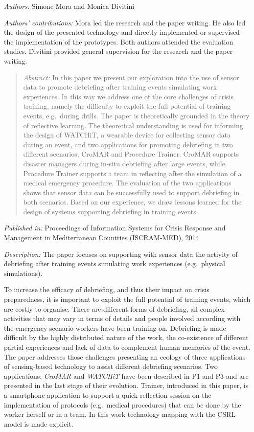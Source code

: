 \emph{Authors:} Simone Mora and Monica Divitini

\emph{Authors' contributions:} Mora led the research and the paper writing. He also led the design of the presented technology and directly implemented or supervised the implementation of the prototypes. Both authors attended the evaluation studies. Divitini provided general supervision for the research and the paper writing.

\begin{quote}
	\emph{Abstract:} In this paper we present our exploration into the use of sensor data to promote debriefing after training events simulating work experiences. In this way we address one of the core challenges of crisis training, namely the difficulty to exploit the full potential of training events, e.g.~during drills. The paper is theoretically grounded in the theory of reflective learning. The theoretical understanding is used for informing the design of WATCHiT, a wearable device for collecting sensor data during an event, and two applications for promoting debriefing in two different scenarios, CroMAR and Procedure Trainer. CroMAR supports disaster managers during in-situ debriefing after large events, while Procedure Trainer supports a team in reflecting after the simulation of a medical emergency procedure. The evaluation of the two applications shows that sensor data can be successfully used to support debriefing in both scenarios. Based on our experience, we draw lessons learned for the design of systems supporting debriefing in training events. 
\end{quote}

\emph{Published in:} Proceedings of Information Systems for Crisis Response and Management in Mediterranean Countries (ISCRAM-MED), 2014

\emph{Description:} The paper focuses on supporting with sensor data the activity of debriefing after training events simulating work experiences (e.g.~physical simulations). 

To increase the efficacy of debriefing, and thus their impact on crisis preparedness, it is important to exploit the full potential of training events, which are costly to organise. There are different forms of debriefing, all complex activities that may vary in terms of details and people involved according with the emergency scenario workers have been training on. Debriefing is made difficult by the highly distributed nature of the work, the co-existence of different partial experiences and lack of data to complement human memories of the event. The paper addresses those challenges presenting an ecology of three applications of sensing-based technology to assist different debriefing scenarios. Two applications: \emph{CroMAR} and \emph{WATCHiT} have been described in P1 and P3 and are presented in the last stage of their evolution. Trainer, introduced in this paper, is a smartphone application to support a quick reflection session on the implementation of protocols (e.g.~medical procedures) that can be done by the worker herself or in a team. In this work technology mapping with the CSRL model is made explicit.

